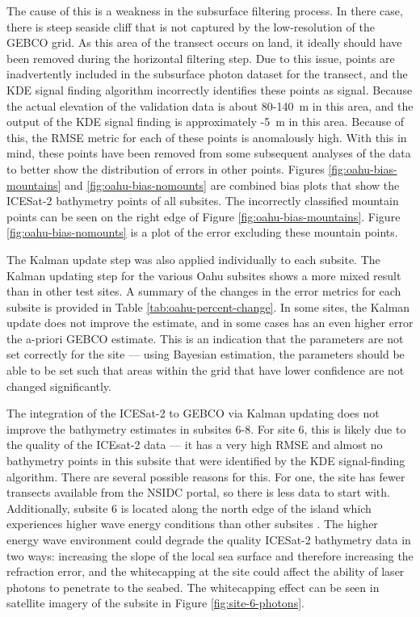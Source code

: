 The cause of this is a weakness in the subsurface filtering process. In there case, there is steep seaside cliff that is not captured by the low-resolution of the GEBCO grid. As this area of the transect occurs on land, it ideally should have been removed during the horizontal filtering step. Due to this issue, points are inadvertently included in the subsurface photon dataset for the transect, and the KDE signal finding algorithm incorrectly identifies these points as signal. Because the actual elevation of the validation data is about 80-140~m in this area, and the output of the KDE signal finding is approximately -5~m in this area. Because of this, the RMSE metric for each of these points is anomalously high. With this in mind, these points have been removed from some subsequent analyses of the data to better show the distribution of errors in other points. Figures \ref{fig:oahu-bias-mountains} and \ref{fig:oahu-bias-nomounts} are combined bias plots that show the ICESat-2 bathymetry points of all subsites. The incorrectly classified mountain points can be seen on the right edge of Figure \ref{fig:oahu-bias-mountains}. Figure \ref{fig:oahu-bias-nomounts} is a plot of the error excluding these mountain points.

The Kalman update step was also applied individually to each subsite. The Kalman updating step for the various Oahu subsites shows a more mixed result than in other test sites. A summary of the changes in the error metrics for each subsite is provided in Table \ref{tab:oahu-percent-change}. In some sites, the Kalman update does not improve the estimate, and in some cases has an even higher error the a-priori GEBCO estimate. This is an indication that the parameters are not set correctly for the site --- using Bayesian estimation, the parameters should be able to be set such that areas within the grid that have lower confidence are not changed significantly.

The integration of the ICESat-2 to GEBCO via Kalman updating does not improve the bathymetry estimates in subsites 6-8. For site 6, this is likely due to the quality of the ICEsat-2 data --- it has a very high RMSE and almost no bathymetry points in this subsite that were identified by the KDE signal-finding algorithm. There are several possible reasons for this. For one, the site has fewer transects available from the NSIDC portal, so there is less data to start with. Additionally, subsite 6 is located along the north edge of the island which experiences higher wave energy conditions than other subsites \parencite{Vitousek2008a}. The higher energy wave environment could degrade the quality ICESat-2 bathymetry data in two ways: increasing the slope of the local sea surface and therefore increasing the refraction error, and the whitecapping at the site could affect the ability of laser photons to penetrate to the seabed. The whitecapping effect can be seen in satellite imagery of the subsite in Figure \ref{fig:site-6-photons}.

